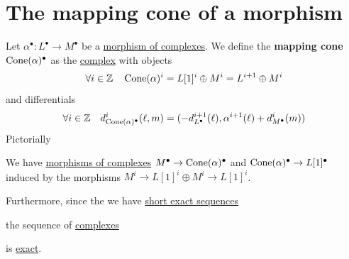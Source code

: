 \documentclass[../../../main]{subfiles}
\begin{document}
\section{The mapping cone of a morphism}

\begin{definition} \label{def:mapping-cone}
  Let \(\alpha^{\bullet}: L^{\bullet} \to M^{\bullet}\) be a \hyperref[def:complex-morphism]{morphism of complexes}.
  We define the \textbf{mapping cone} \(\operatorname{Cone}(\alpha)^{\bullet}\) as the \hyperref[def:complex]{complex} with objects
  \begin{align*}
    \forall i \in \mathbb{Z} \quad \operatorname{Cone}(\alpha)^{i} = L[1]^{i} \oplus M^{i} = L^{i+1} \oplus M^{i}
  \end{align*}
  and differentials
  \begin{align*}
    \forall i \in \mathbb{Z} \quad d_{\operatorname{Cone}(\alpha)^{\bullet}}^{i}(\ell, m) = (-d_{L^{\bullet}}^{i+1}(\ell), \alpha^{i+1}(\ell) + d_{M^{\bullet}}^{i}(m))
  \end{align*}
  Pictorially
  \begin{center}
  \end{center}
\end{definition}

\begin{remark}
  We have \hyperref[def:complex-morphism]{morphisms of complexes} \(M^{\bullet} \to \operatorname{Cone}(\alpha)^{\bullet}\) and \(\operatorname{Cone}(\alpha)^{\bullet} \to L[1]^{\bullet}\) induced by the morphisms \(M^{i} \to L[1]^{i} \oplus M^{i} \to L[1]^{i}\).

  Furthermore, since the we have \hyperref[def:short-exact-sequence]{short exact sequences}
  \begin{center}
  \end{center}
  the sequence of \hyperref[def:complex]{complexes}
  \begin{center}
  \end{center}
  is \hyperref[def:short-exact-sequence]{exact}.
\end{remark}
\end{document}
